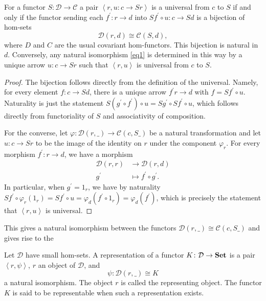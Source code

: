\documentclass[10pt]{amsart}
\begin{document}
\begin{prop}
  For a functor $S \colon \mathcal{D} \rightarrow \mathcal{C}$ a pair $\left<r, u \colon c \rightarrow Sr\right>$ is a universal from $c$ to $S$ if and only if the functor sending each $f^\prime \colon r \rightarrow d$ into $Sf^\prime \circ u \colon c \rightarrow Sd$ is a bijection of hom-sets
  \begin{equation}\label{eq1}
    \mathcal{D}(r,d) \cong \mathcal{C}(S,d),
  \end{equation}
  where $D$ and $C$ are the usual covariant hom-functors.
  This bijection is natural in $d$.
  Conversely, any natural isomorphism \eqref{eq1} is determined in this way by a unique arrow $u \colon c \rightarrow Sr$ such that $\left<r,u\right>$ is universal from $c$ to $S$.
  
  \begin{proof}
    The bijection follows directly from the definition of the universal.
    Namely, for every element $f \colon c \rightarrow Sd$, there is a unique arrow $f^\prime r \rightarrow d$ with $f = Sf^\prime \circ u$.
    Naturality is just the statement $S(g^\prime \circ f^\prime) \circ u = Sg^\prime \circ Sf^\prime \circ u$, which follows directly from functoriality of $S$ and associativity of composition.

    For the converse, let $\varphi \colon \mathcal{D}(r,\_) \rightarrow \mathcal{C}(c, {S\_})$ be a natural transformation and let $u \colon c \rightarrow Sr$ to be the image of the identity on $r$ under the component $\varphi_r$.
    For every morphism $f^\prime \colon r \rightarrow d$, we have a morphism
    \begin{align*}
      \mathcal{D}(r,r) &\rightarrow \mathcal{D}(r,d)\\
      g^\prime &\mapsto f^\prime \circ g^\prime.
    \end{align*}
    In particular, when $g^\prime = 1_r$, we have by naturality $Sf^\prime \circ \varphi_r(1_r) = Sf^\prime \circ u = \varphi_d(f^\prime \circ 1_r) = \varphi_d(f^\prime)$, which is precisely the statement that $\left<r,u\right>$ is universal.
  \end{proof}
\end{prop}
  This gives a natural isomorphism between the functors $\mathcal{D}(r,\_) \cong \mathcal{C}(c, S\_)$ and gives rise to the 
  \begin{defn}
    Let $\mathcal{D}$ have small hom-sets.
    A representation of a functor $K \colon \mathcal{D} \rightarrow {\bf Set}$ is a pair $\left<r, \psi\right>$, $r$ an object of $\mathcal{D}$, and
    $$\psi \colon \mathcal{D}(r, \_) \cong K$$
    a natural isomorphism.
    The object $r$ is called the representing object.
    The functor $K$ is said to be representable when such a representation exists.
  \end{defn}
\end{document}
